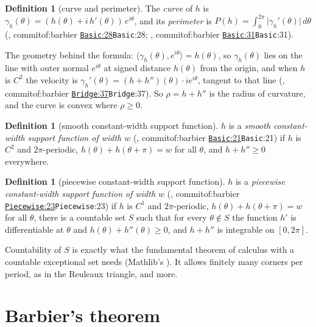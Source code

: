 \documentclass[11pt]{article}
\theoremstyle{definition}
\newtheorem{definition}[theorem]{Definition}
\theoremstyle{remark}
\newcommand{\commitof}[1]{\csname commitof:#1\endcsname}
\newcommand{\repo}[1]{https://github.com/jpbald93/#1}
\newcommand{\src}[4]{\ifcsname commitof:#1\endcsname
  \href{\repo{#1}/blob/\commitof{#1}/#2/#3.lean\#L#4}{\texttt{#3}:#4}\else\texttt{#3}:#4\fi}
\begin{document}
\begin{definition}[curve and perimeter]\label{def:curve}
The \emph{curve} of $h$ is $\gamma_h(\theta) = (h(\theta) + i\,h'(\theta))\,e^{i\theta}$, and its
\emph{perimeter} is $P(h) = \int_0^{2\pi}\lvert\gamma_h'(\theta)\rvert\,d\theta$
(, \src{barbier}{Barbier}{Basic}{28}; , \src{barbier}{Barbier}{Basic}{31}).
\end{definition}

The geometry behind the formula: $\langle\gamma_h(\theta), e^{i\theta}\rangle = h(\theta)$, so
$\gamma_h(\theta)$ lies on the line with outer normal $e^{i\theta}$ at signed distance $h(\theta)$
from the origin, and when $h$ is $C^2$ the velocity is
$\gamma_h'(\theta) = (h+h'')(\theta)\cdot i e^{i\theta}$, tangent to that line
(, \src{barbier}{Barbier}{Bridge}{37}). So $\rho = h+h''$ is the radius
of curvature, and the curve is convex where $\rho\ge 0$.

\begin{definition}[smooth constant-width support function]\label{def:cws}
$h$ is a \emph{smooth constant-width support function of width $w$}
(, \src{barbier}{Barbier}{Basic}{21}) if $h$ is $C^2$ and
$2\pi$-periodic, $h(\theta)+h(\theta+\pi) = w$ for all $\theta$, and $h+h''\ge 0$ everywhere.
\end{definition}

\begin{definition}[piecewise constant-width support function]\label{def:pcw}
$h$ is a \emph{piecewise constant-width support function of width $w$}
(, \src{barbier}{Barbier}{Piecewise}{23}) if $h$ is $C^1$ and
$2\pi$-periodic, $h(\theta)+h(\theta+\pi) = w$ for all $\theta$, there is a countable set $S$ such
that for every $\theta\notin S$ the function $h'$ is differentiable at $\theta$ and
$h(\theta)+h''(\theta)\ge 0$, and $h+h''$ is integrable on $[0,2\pi]$.
\end{definition}

Countability of $S$ is exactly what the fundamental theorem of calculus with a countable exceptional
set needs (Mathlib's ). It
allows finitely many corners per period, as in the Reuleaux triangle, and more.

\section{Barbier's theorem}\label{sec:barbier}
\end{document}
